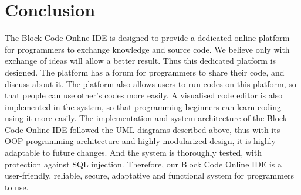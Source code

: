 \chapter{Conclusion}
The Block Code Online IDE is designed to provide a dedicated online platform for programmers to exchange knowledge and source code. We believe only with exchange of ideas will allow a better result. Thus this dedicated platform is designed. The platform has a forum for programmers to share their code, and discuss about it. The platform also allows users to run codes on this platform, so that people can use other's codes more easily. A visualised code editor is also implemented in the system, so that programming beginners can learn coding using it more easily. The implementation and system architecture of the Block Code Online IDE followed the UML diagrams described above, thus with its OOP programming architecture and highly modularized design, it is highly adaptable to future changes. And the system is thoroughly tested, with protection against SQL injection. Therefore, our Block Code Online IDE is a user-friendly, reliable, secure, adaptative and functional system for programmers to use.
